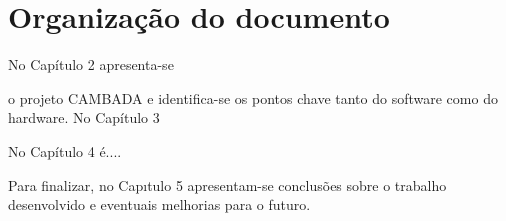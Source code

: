 \section{Organização do documento}




No Capítulo 2 apresenta-se 



o projeto CAMBADA e identifica-se os pontos chave tanto
do software como do hardware. No Capítulo 3 


No Capítulo 4 é.... 

Para finalizar, no Capıtulo 5 apresentam-se conclusões sobre o trabalho desenvolvido e eventuais melhorias para o futuro.









